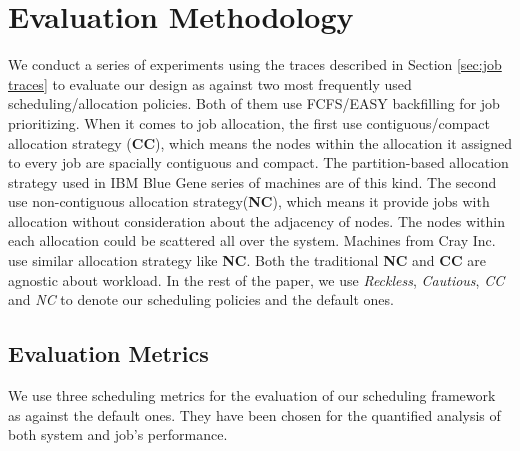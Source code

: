 \documentclass[conference]{IEEEtran}
\begin{document}
\section{Evaluation Methodology}
\label{sec: evaluation methodology}

We conduct a series of experiments using the traces described in Section \ref{sec:job traces} to evaluate our design as against two most frequently used scheduling/allocation policies. Both of them use FCFS/EASY backfilling for job prioritizing. When it comes to job allocation, the first use contiguous/compact allocation strategy (\textbf{CC}), which means the nodes within the allocation it assigned to every job are spacially contiguous and compact. The partition-based allocation strategy used in IBM Blue Gene series of machines are of this kind. The second use non-contiguous allocation strategy(\textbf{NC}), which means it provide jobs with allocation without consideration about the adjacency of nodes. The nodes within each allocation could be scattered all over the system. Machines from Cray Inc. use similar allocation strategy like \textbf{NC}. Both the traditional \textbf{NC} and \textbf{CC} are agnostic about workload. In the rest of the paper, we use \emph{Reckless}, \emph{Cautious}, \emph{CC} and \emph{NC} to denote our scheduling policies and the default ones.

\subsection{Evaluation Metrics} 
\label{sec:metrics}
We use three scheduling metrics for the evaluation of our scheduling framework as against the default ones. They have been chosen for the quantified analysis of both system and job's performance.
\end{document}
